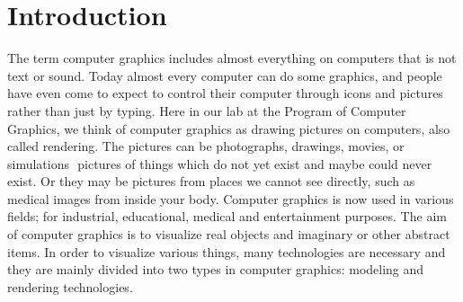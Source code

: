 \section{Introduction}
The  term  computer  graphics  includes  almost  everything  on  computers  that  is  not  text  or  sound.  Today
almost  every  computer  can  do  some  graphics,  and  people  have  even  come  to  expect  to  control  their
computer  through  icons  and  pictures  rather  than  just  by  typing.  Here  in  our  lab  at  the  Program  of
Computer  Graphics,  we  think  of  computer  graphics  as  drawing  pictures  on  computers,  also  called
rendering.  The  pictures  can  be photographs, drawings, movies, or simulations ­­ pictures of things which
do  not  yet  exist  and  maybe  could   never  exist.  Or  they  may  be  pictures  from  places  we  cannot  see
directly,  such  as  medical  images  from  inside  your  body.  Computer  graphics  is  now  used  in  various
fields;  for  industrial,  educational,  medical  and  entertainment  purposes.  The  aim  of  computer  graphics  is
to  visualize  real  objects  and  imaginary  or  other  abstract  items.  In  order to visualize various things, many
technologies  are  necessary  and  they  are  mainly  divided  into  two  types  in  computer  graphics:  modeling
and  rendering  technologies.\\

